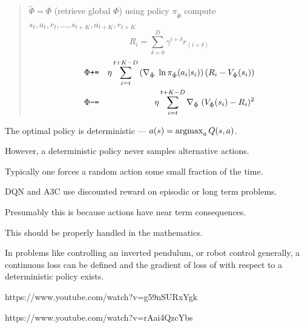 {

\begin{quotation}
  \noindent $\tilde{\Phi} = \Phi$ (retrieve global $\Phi$)\newline
  \noindent using policy $\pi_{\tilde{\Phi}}$ compute $s_t,a_t,r_t,\ldots,s_{t+K},a_{t+K},r_{t+K}$
  $$R_i = \sum_{\delta=0}^D \gamma^{i+\delta} r_{(i+\delta)}$$
  \begin{eqnarray*}
  \Phi  &\mbox{\tt +=} & \eta \sum_{i=t}^{t+K-D} \left(\nabla_{\tilde{\Phi}}\;\ln \pi_{\tilde{\Phi}}(a_i|s_i)\right)\left(R_i - V_{\tilde{\Phi}}(s_i)\right)\\
  \Phi & \mbox{\tt -=} & \eta \sum_{i=t}^{t+K-D} \nabla_{\tilde{\Phi}}\;(V_{\tilde{\Phi}}(s_i) - R_i)^2
  \end{eqnarray*}
\end{quotation}


The optimal policy is deterministic --- $a(s) = \operatorname*{argmax}_a Q(s,a)$.

\vfill
However, a deterministic policy never samples alternative actions.

\vfill
Typically one forces a random action some small fraction of the time.



DQN and A3C use discounted reward on episodic or long term problems.

\vfill
Presumably this is because actions have near term consequences.

\vfill
This should be properly handled in the mathematics.


In problems like controlling an inverted pendulum, or robot control generally,
a continuous loss can be defined and the gradient of loss of with respect to a deterministic policy exists.


https://www.youtube.com/watch?v=g59nSURxYgk

https://www.youtube.com/watch?v=rAai4QzcYbs




}



